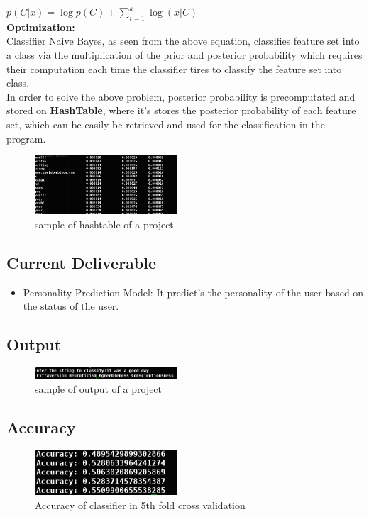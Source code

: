 \documentclass[a4paper, 12pt, onepage]{article}
\begin{document}
\begin{enumerate}
	$p(C|x) = \log p(C) + \sum_{i=1}^{k} \log(x|C) $
	\\
	\textbf{Optimization: }\\
	Classifier Naive Bayes, as seen from the above equation, classifies feature set into a class via the multiplication of the prior and posterior probability which requires their computation each time the classifier tires to classify the feature set into class. \\
	In order to solve the above problem, posterior probability is precomputated and stored on \textbf{HashTable}, where it's stores the posterior probability of each feature set, which can be easily be retrieved and used for the classification in the program.
      \begin{figure}[h!]
	      \centering
	      \includegraphics[width=200px]{hashtable.png}
	      \caption{sample of hashtable of a project}
	\end{figure}
	\end{enumerate}
	\subsection{Current Deliverable}
	\begin{itemize}
	\item Personality Prediction Model:
		It predict's the personality of the user based on the status of the user.
	\end{itemize}
\subsection{Output}
      \begin{figure}[h!]
	      \centering
	      \includegraphics[width=200px]{output.png}
	      \caption{sample of output of a project}
	\end{figure}
	\subsection{Accuracy}
      \begin{figure}[h!]
	      \centering
	      \includegraphics[width=200px]{accuracy.png}
	      \caption{Accuracy of classifier in 5th fold cross validation}
	\end{figure}
\end{document}
